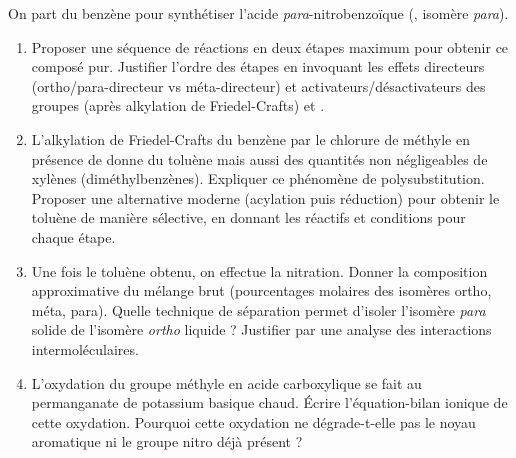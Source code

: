 \documentclass[11pt]{article}
\begin{document}
\begin{exercice}
On part du benzène pour synthétiser l'acide \textit{para}-nitrobenzoïque (, isomère \textit{para}).
\begin{enumerate}
    \item Proposer une séquence de réactions en deux étapes maximum pour obtenir ce composé pur. Justifier l'ordre des étapes en invoquant les effets directeurs (ortho/para-directeur vs méta-directeur) et activateurs/désactivateurs des groupes  (après alkylation de Friedel-Crafts) et .
    \item L'alkylation de Friedel-Crafts du benzène par le chlorure de méthyle en présence de  donne du toluène mais aussi des quantités non négligeables de xylènes (diméthylbenzènes). Expliquer ce phénomène de polysubstitution. Proposer une alternative moderne (acylation puis réduction) pour obtenir le toluène de manière sélective, en donnant les réactifs et conditions pour chaque étape.
    \item Une fois le toluène obtenu, on effectue la nitration. Donner la composition approximative du mélange brut (pourcentages molaires des isomères ortho, méta, para). Quelle technique de séparation permet d'isoler l'isomère \textit{para} solide de l'isomère \textit{ortho} liquide ? Justifier par une analyse des interactions intermoléculaires.
    \item L'oxydation du groupe méthyle en acide carboxylique se fait au permanganate de potassium basique chaud. Écrire l'équation-bilan ionique de cette oxydation. Pourquoi cette oxydation ne dégrade-t-elle pas le noyau aromatique ni le groupe nitro déjà présent ?
\end{enumerate}
\end{exercice}
\end{document}
